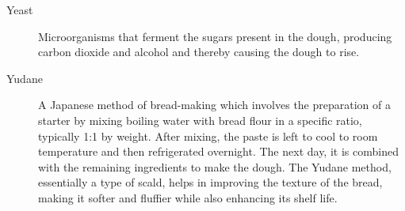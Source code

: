 \begin{description}
\item[Yeast] Microorganisms that ferment the sugars present in the dough, producing
carbon dioxide and alcohol and thereby causing the dough to rise.

\item[Yudane] A Japanese method of bread-making which involves the preparation
of a starter by mixing boiling water with bread flour in a specific ratio, typically 1:1
by weight. After mixing, the paste is left to cool to room temperature and then
refrigerated overnight. The next day, it is combined with the remaining ingredients
to make the dough. The Yudane method, essentially a type of scald, helps in
improving the texture of the bread, making it softer and fluffier while also enhancing
its shelf life.

\end{description}
